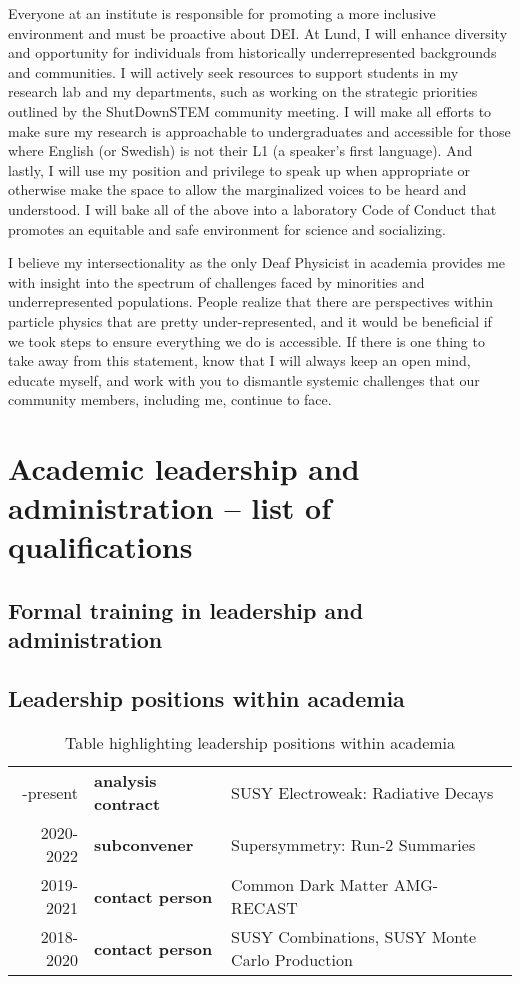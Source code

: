 Everyone at an institute is responsible for promoting a more inclusive environment and must be proactive about DEI. At Lund, I will enhance diversity and opportunity for individuals from historically underrepresented backgrounds and communities. I will actively seek resources to support students in my research lab and my departments, such as working on the strategic priorities outlined by the ShutDownSTEM community meeting. I will make all efforts to make sure my research is approachable to undergraduates and accessible for those where English (or Swedish) is not their L1 (a speaker's first language). And lastly, I will use my position and privilege to speak up when appropriate or otherwise make the space to allow the marginalized voices to be heard and understood. I will bake all of the above into a laboratory Code of Conduct that promotes an equitable and safe environment for science and socializing.

I believe my intersectionality as the only Deaf Physicist in academia provides me with insight into the spectrum of challenges faced by minorities and underrepresented populations. People realize that there are perspectives within particle physics that are pretty under-represented, and it would be beneficial if we took steps to ensure everything we do is accessible. If there is one thing to take away from this statement, know that I will always keep an open mind, educate myself, and work with you to dismantle systemic challenges that our community members, including me, continue to face.

\section{Academic leadership and administration -- list of qualifications} \label{sec:academic-leadership-and-administration-list-of-qualifications}
\subsection{Formal training in leadership and administration \noneyet} \label{ssec:formal-training-in-leadership-and-administration-noneyet}
\subsection{Leadership positions within academia} \label{ssec:leadership-positions-within-academia}

\begin{table}[h!]
	\centering
	\footnotesize
	\caption{Table highlighting leadership positions within academia}
	\begin{tabular}{r|>{\bfseries}ll}
		\centering
		2024-present & analysis contract & SUSY Electroweak: Radiative Decays             \\
		2020-2022    & subconvener       & Supersymmetry: Run-2 Summaries                 \\
		2019-2021    & contact person    & Common Dark Matter AMG-RECAST                  \\
		2018-2020    & contact person    & SUSY Combinations, SUSY Monte Carlo Production \\
	\end{tabular}
\end{table}

